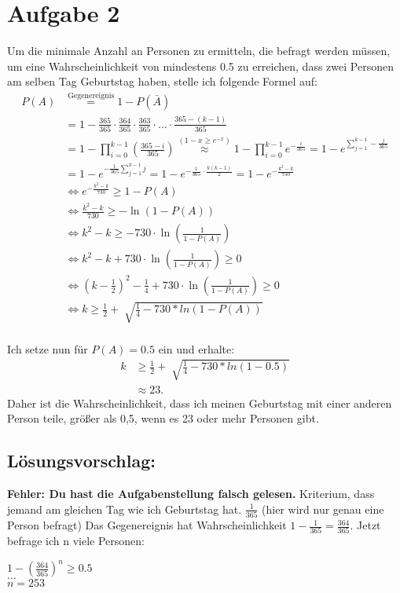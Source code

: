 \documentclass[a4paper]{scrartcl}
\begin{document}
\section*{Aufgabe 2}
Um die minimale Anzahl an Personen zu ermitteln, die befragt werden müssen, um eine Wahrscheinlichkeit von mindestens 0.5 zu erreichen, dass zwei Personen am selben Tag Geburtstag haben, stelle ich folgende Formel auf: \vspace{6pt}
\[
\begin{aligned}
    P(A) &\overset{\text{Gegenereignis}}{=} 1 - P(\bar{A}) \\
    &= 1 - \frac{365}{365} \cdot \frac{364}{365} \cdot \frac{363}{365} \cdot \ldots \cdot \frac{365-(k-1)}{365} \\
    &= 1 - \prod^{k-1}_{i=0} (\frac{365-i}{365}) \overset{(1-x \geq e^{-x})}{\approx} 1 - \prod^{k-1}_{i=0} e^{-\frac{i}{365}} = 1 - e^{\sum ^{k-1}_{j=1} - \frac{j}{365}} \\
    &= 1 - e^{-\frac{1}{365} \sum ^{k-1}_{j=1} j} = 1 - e^{-\frac{1}{365} \cdot \frac{k(k-1)}{2}} = 1 - e^{-\frac{k^2 - k}{730}} \\
    &\Leftrightarrow e^{-\frac{k^2 - k}{730}} \geq 1 - P(A) \\
    &\Leftrightarrow \frac{k^2 - k}{730} \geq - \ln(1 - P(A)) \\
    &\Leftrightarrow k^2 - k \geq - 730 \cdot \ln(\frac{1}{1 - P(A)}) \\
    &\Leftrightarrow k^2 - k + 730 \cdot \ln(\frac{1}{1 - P(A)}) \geq 0 \\
    &\Leftrightarrow (k-\frac{1}{2})^2 - \frac{1}{4} + 730 \cdot \ln(\frac{1}{1 - P(A)}) \geq 0 \\
    &\Leftrightarrow k \geq \frac{1}{2} + \sqrt[]{\frac{1}{4}-730*ln(1-P(A))} \\
\end{aligned}
\]

Ich setze nun für $P(A) = 0.5$ ein und erhalte: \vspace{6pt}
\[
\begin{aligned}
    k &\geq \frac{1}{2} + \sqrt[]{\frac{1}{4}-730*ln(1-0.5)} \\
    &\approx 23.
\end{aligned}
\]
Daher ist die Wahrscheinlichkeit, dass ich meinen Geburtstag mit einer anderen Person teile, größer als 0,5, wenn es 23 oder mehr Personen gibt.

\subsection*{Lösungsvorschlag:}
\textbf{Fehler: Du hast die Aufgabenstellung falsch gelesen.}
Kriterium, dass jemand am gleichen Tag wie ich Geburtstag hat. $\frac{1}{365}$ (hier wird nur genau eine Person befragt)
Das Gegenereignis hat Wahrscheinlichkeit $1 - \frac{1}{365} = \frac{364}{365}$.
Jetzt befrage ich n viele Personen:
\begin{center}
    $1 - (\frac{364}{365})^n \geq 0.5$ \\
    $\dots$ \\
    $n = 253$
\end{center}
\end{document}
